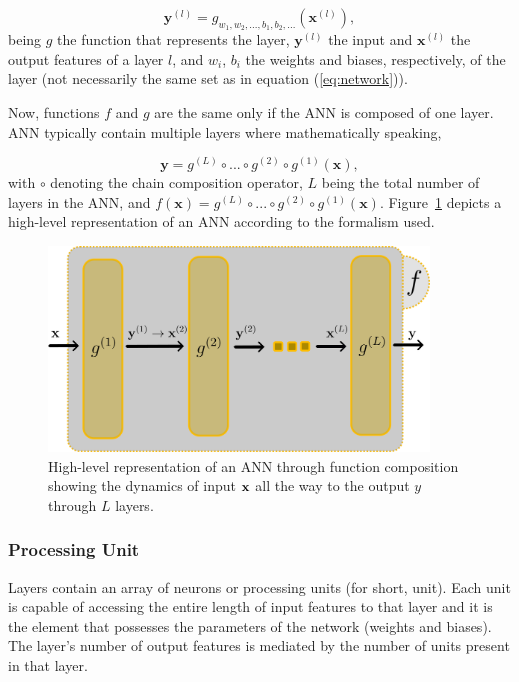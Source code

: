 \begin{equation}
	\mathbf{y}^{(l)} = g_{w_{1}, w_{2}, ..., b_{1}, b_{2}, ...}(\mathbf{x}^{(l)}),
	\label{eq:layer}
\end{equation}
being $ g $ the function that represents the layer, $ \mathbf{y}^{(l)} $ the input and $ \mathbf{x}^{(l)} $ the output features of a layer $ l $, and $ w_{i} $, $ b_{i} $ the weights and biases, respectively, of the layer (not necessarily the same set as in equation (\ref{eq:network})). 

Now, functions $ f $ and $ g $ are the same only if the \gls{ANN} is composed of one layer. \gls{ANN} typically contain multiple layers where mathematically speaking,

\begin{equation}
	\mathbf{y} = g^{(L)} \circ ... \circ g^{(2)} \circ g^{(1)}(\mathbf{x}),
	\label{eq:layer_comp_network}
\end{equation}
with $ \circ $ denoting the chain composition operator, $ L $ being the total number of layers in the \gls{ANN}, and $ f(\mathbf{x}) = g^{(L)} \circ ... \circ g^{(2)} \circ g^{(1)}(\mathbf{x}) $. Figure~\ref{fig:raw_net} depicts a high-level representation of an \gls{ANN} according to the formalism used.

\begin{figure}[htbp]
	\centering
	\includegraphics[width=0.9\textwidth]{ch3/assets/raw_net.png}
	\caption{High-level representation of an ANN through function composition showing the dynamics of input $ \mathbf{x} $ all the way to the output $ y $ through $ L $ layers. }
	\label{fig:raw_net}
\end{figure}

\subsubsection{Processing Unit}
Layers contain an array of neurons or processing units (for short, unit). Each unit is capable of accessing the entire length of input features to that layer and it is the element that possesses the parameters of the network (weights and biases). The layer's number of output features is mediated by the number of units present in that layer.

